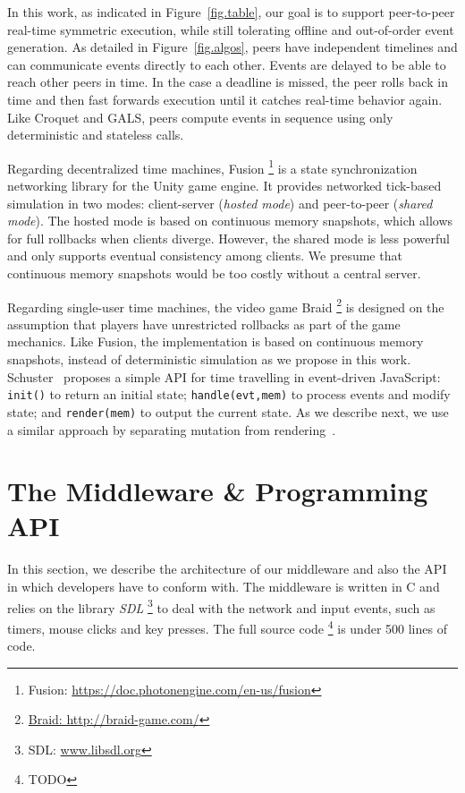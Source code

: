 \documentclass[10pt,journal,compsoc]{IEEEtran}
\newcommand{\code}[1]  {\texttt{\footnotesize{#1}}}
\begin{document}
In this work, as indicated in Figure~\ref{fig.table}, our goal is to support
peer-to-peer real-time symmetric execution, while still tolerating offline and
out-of-order event generation.
%
As detailed in Figure~\ref{fig.algos}, peers have independent timelines and
can communicate events directly to each other.
Events are delayed to be able to reach other peers in time.
In the case a deadline is missed, the peer rolls back in time and then fast
forwards execution until it catches real-time behavior again.
%
Like Croquet and GALS, peers compute events in sequence using only
deterministic and stateless calls.

Regarding decentralized time machines, Fusion%
\footnote{Fusion: \url{https://doc.photonengine.com/en-us/fusion}}
is a state synchronization networking library for the Unity game engine.
It provides networked tick-based simulation in two modes: client-server
(\emph{hosted mode}) and peer-to-peer (\emph{shared mode}).
The hosted mode is based on continuous memory snapshots, which allows for
full rollbacks when clients diverge.
However, the shared mode is less powerful and only supports eventual
consistency among clients.
We presume that continuous memory snapshots would be too costly without a
central server.

Regarding single-user time machines, the video game Braid%
\footnote{\url{Braid: http://braid-game.com/}}
is designed on the assumption that players have unrestricted rollbacks as part
of the game mechanics.
Like Fusion, the implementation is based on continuous memory snapshots,
instead of deterministic simulation as we propose in this work.
%
Schuster~\cite{tml.js} proposes a simple API for time travelling in
event-driven JavaScript:
    \code{init()} to return an initial state;
    \code{handle(evt,mem)} to process events and modify state; and
    \code{render(mem)} to output the current state.
As we describe next, we use a similar approach by separating mutation from
rendering~\cite{tml.alive}.

\section{The Middleware \& Programming API}
\label{sec.tml}

In this section, we describe the architecture of our middleware and also the
API in which developers have to conform with.
%
The middleware is written in C and relies on the library \emph{SDL}%
\footnote{SDL: \url{www.libsdl.org}}
to deal with the network and input events, such as timers, mouse clicks and
key presses.
The full source code%
\footnote{TODO}
is under 500 lines of code.
\end{document}
